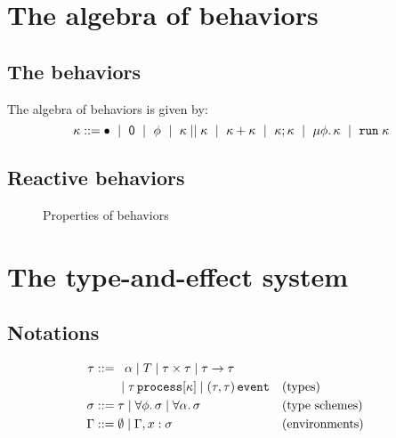 \documentclass[9pt,preprint]{sigplanconf}
\newcommand{\sdeq}{::=}
\begin{document}
\section{The algebra of behaviors}

\subsection{The behaviors}

The algebra of behaviors is given by:
\[
\rk \sdeq \effplus ~\mid~ \effmin ~\mid~ \effvar ~\mid~ \effpar{\rk}{\rk} ~\mid~ \effor{\rk}{\rk}
~\mid~ \effcon{\rk}{\rk}  ~\mid~ \effrec{\effvar}{\rk}  ~\mid~ \effrun{\rk}
\]

\subsection{Reactive behaviors}

\begin{figure*}



\caption{Properties of behaviors}
\end{figure*}


\section{The type-and-effect system}

\subsection{Notations}

\begin{align*}
\rt \sdeq &\;\;\; \rtvar \mid T \mid \rtprod{\rt}{\rt} \mid \rtarrow{\rt}{\rt} \\
    &\;\mid \rtproc{\rt}{\rk} \mid \rtsig{\rt}{\rt} && \text{(types)} \\
\rs \sdeq &\; \rt \mid \forall \effvar.\, \rs \mid \forall \rtvar.\, \rs && \text{(type schemes)} \\
\tyenv \sdeq&\; \emptyset \mid \tyenv \tyconcat x : \rs && \text{(environments)}
\end{align*}
\end{document}
